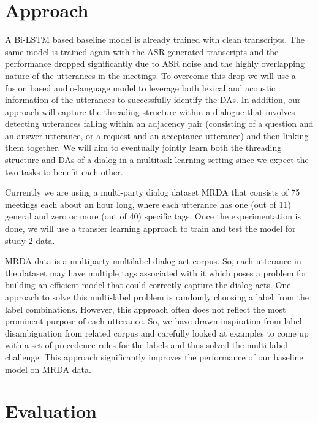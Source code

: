 \section{Approach}
A Bi-LSTM based baseline model is already trained with clean transcripts. The
same model is trained again with the ASR generated transcripts and the
performance dropped significantly due to ASR noise and the highly overlapping
nature of the utterances in the meetings. To overcome this drop we will use a
fusion based audio-language model to leverage both lexical and acoustic
information of the utterances to successfully identify the DAs. In addition,
our approach will capture the threading structure within a dialogue that
involves detecting utterances falling within an adjacency pair (consisting of a
question and an answer utterance, or a request and an acceptance utterance) and
then linking them together. We will aim to eventually jointly learn both the
threading structure and DAs of a dialog in a multitask learning setting since
we expect the two tasks to benefit each other.

Currently we are using a multi-party dialog dataset MRDA
 that consists of 75 meetings each about an hour long,
where each utterance has one (out of 11) general and zero or more (out of 40)
specific tags. Once the experimentation is done, we will use a transfer
learning approach to train and test the model for study-2 data. 

MRDA data is a multiparty multilabel dialog act corpus. So, each utterance in
the dataset may have multiple tags associated with it which poses a problem for
building an efficient model that could correctly capture the dialog acts. One approach
to solve this multi-label problem is randomly choosing a label from 
the label combinations. However, this approach often does not reflect the most
prominent purpose of each utterance. So, we have drawn inspiration from label
disambiguation from related corpus and carefully looked at examples to come up
with a set of precedence rules for the labels and thus solved the multi-label
challenge. This approach significantly improves the performance of our baseline
model on MRDA data.

\section{Evaluation}

